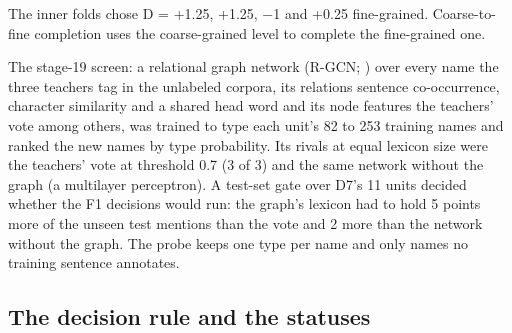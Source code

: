 \documentclass[11pt,a4paper]{article}
\begin{document}
The inner folds chose D = +1.25, +1.25, −1 and +0.25 fine-grained.
Coarse-to-fine completion uses the coarse-grained level to complete the
fine-grained one.

The stage-19 screen: a relational graph network (R-GCN;
\citealp{schlichtkrull2018modeling}) over every name the three teachers tag in the
unlabeled corpora, its relations sentence co-occurrence, character
similarity and a shared head word and its node features the teachers' vote
among others, was trained to type each unit's 82 to 253 training names and
ranked the new names by type probability. Its rivals at equal lexicon size
were the teachers' vote at threshold 0.7 (3 of 3) and the same network
without the graph (a multilayer perceptron). A test-set gate over D7's 11
units decided whether the F1 decisions would run: the graph's lexicon had
to hold 5 points more of the unseen test mentions than the vote and 2 more
than the network without the graph. The probe keeps one type per name and
only names no training sentence annotates.

\hypertarget{the-decision-rule-and-the-statuses}{%
\subsection{The decision rule and the statuses}\label{the-decision-rule-and-the-statuses}}
\end{document}
